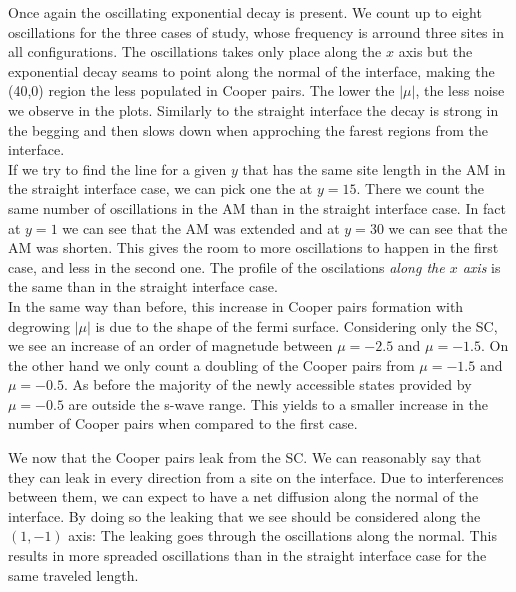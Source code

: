 \documentclass[..\main.tex]{subfile}
\begin{document}
Once again the oscillating exponential decay is present. We count up to eight oscillations for the three cases of study, whose
frequency is arround three sites in all configurations. The oscillations takes only place along the $x$ axis but the exponential decay
seams to point along the normal of the interface, making the (40,0) region the less populated in Cooper pairs.
The lower the $|\mu|$, the less noise we observe in the plots. Similarly to the straight interface the decay is strong in the begging
and then slows down when approching the farest regions from the interface.\\

If we try to find the line for a given $y$ that has the same site length in the AM in the straight interface case, we can pick one the at $y=15$.
There we count the same number of oscillations in the AM than in the straight interface case. In fact at $y=1$ we can see that the AM was
extended and at $y=30$ we can see that the AM was shorten. This gives the room to more oscillations to happen in the first case,
and less in the second one. The profile of the oscilations \textit{along the $x$ axis} is the same than in the straight interface case. \\

In the same way than before, this increase in Cooper pairs formation with degrowing $|\mu|$ is due to the shape of the fermi surface.
Considering only the SC, we see an increase of an order of magnetude between $\mu=-2.5$ and $\mu=-1.5$. On the other hand we only count
a doubling of the Cooper pairs from $\mu=-1.5$ and $\mu=-0.5$.
As before the majority of the newly accessible states provided by $\mu=-0.5$ are outside the s-wave range.
This yields to a smaller increase in the number of Cooper pairs when compared to the first case.


We now that the Cooper pairs leak from the SC. We can reasonably say that they can leak in every direction from a site on the interface.
Due to interferences between them, we can expect to have a net diffusion along the normal of the interface. By doing so the leaking that we see
should be considered along the $(1,-1)$ axis: The leaking goes through the oscillations along the normal. This results in more spreaded
oscillations than in the straight interface case for the same traveled length.
\end{document}
